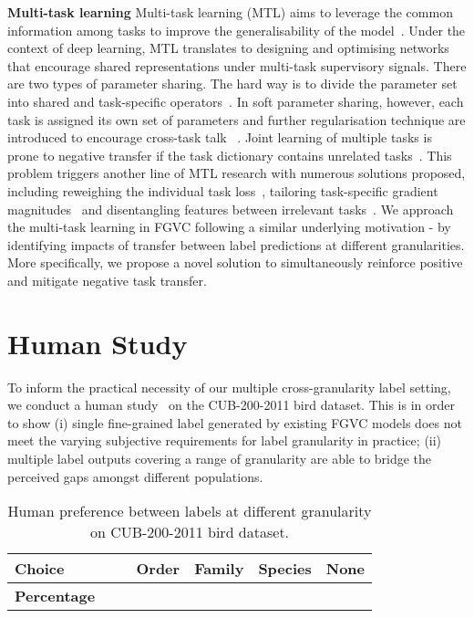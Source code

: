 \documentclass[final]{cvpr}
\newcommand{\keypoint}[1]{\vspace{0.05cm}\noindent\textbf{#1}\quad}
\begin{document}
\keypoint{Multi-task learning} Multi-task learning (MTL) aims to leverage the common information among tasks to improve the generalisability of the model~\cite{chen2018driving,chen2019progressive,luo2020multi,zhou2020pattern}. 
Under the context of deep learning, MTL translates to designing and optimising networks that encourage shared representations under multi-task supervisory signals. There are two types of parameter sharing. The hard way is to divide the parameter set into shared and task-specific operators~\cite{kokkinos2017ubernet, kendall2018multi, chen2018gradnorm}. In soft parameter sharing, however, each task is assigned its own set of parameters and 
further regularisation technique are introduced to encourage cross-task talk ~\cite{misra2016cross,ruder2019latent,gao2019nddr}.
Joint learning of multiple tasks is prone to negative transfer if the task dictionary contains unrelated tasks~\cite{kokkinos2017ubernet,he2017mask}. This problem triggers another line of MTL research with numerous solutions proposed, including reweighing the individual task loss~\cite{kendall2018multi,sinha2018gradient}, 
tailoring task-specific gradient magnitudes~\cite{chen2018gradnorm} and disentangling features between irrelevant tasks~\cite{guo2018dynamic,zhao2018modulation}. 
We approach the multi-task learning in FGVC following a similar underlying motivation - by identifying impacts of transfer between label predictions at different granularities. More specifically, we propose a novel solution to simultaneously reinforce positive and mitigate negative task transfer.


\section{Human Study}\label{Pilot_Study}


To inform the practical necessity of our multiple cross-granularity label setting, we conduct a human study~\cite{granqvist2013hedging} on the CUB-200-2011 bird dataset. This is in order to show (i) single fine-grained label generated by existing FGVC models does not meet the varying subjective requirements for label granularity in practice; (ii) multiple label outputs covering a range of granularity are able to bridge the perceived gaps amongst different populations.


\begin{table}[!t]
  \centering

 \begin{adjustbox}{width=0.9\linewidth,center}
       \footnotesize   \begin{tabular}{l|cccc}
    \toprule
    \textbf{Choice} \ \ \ & \textbf{Order} & \textbf{Family} & \textbf{Species} & \textbf{None}\\
    \midrule
    \textbf{Percentage} \ \ \ &  &  &  &  \\
    \bottomrule
    \end{tabular}\end{adjustbox}
  \caption{Human preference between labels at different granularity on CUB-200-2011 bird dataset.}
  \label{tab:addlabel}\vspace{-4mm}
\end{table}
\end{document}
